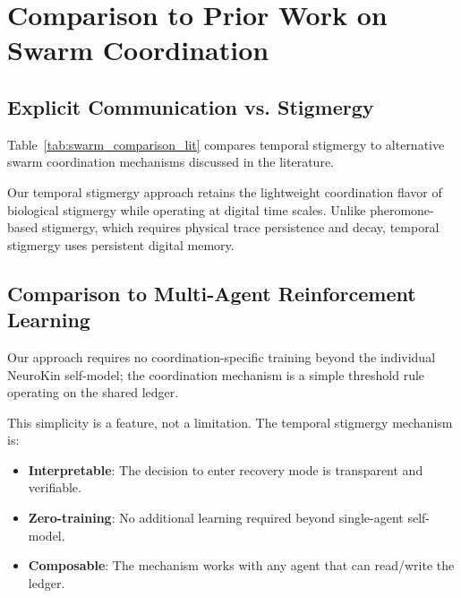 ﻿\documentclass[12pt,a4paper,oneside]{report}
\begin{document}
\section{Comparison to Prior Work on Swarm Coordination}

\subsection{Explicit Communication vs. Stigmergy}

Table~\ref{tab:swarm_comparison_lit} compares temporal stigmergy to alternative swarm coordination mechanisms discussed in the literature.

\begin{table}[H]
\centering
\caption{Comparison of swarm coordination mechanisms.}
\label{tab:swarm_comparison_lit}
\end{table}

Our temporal stigmergy approach retains the lightweight coordination flavor of biological stigmergy while operating at digital time scales. Unlike pheromone-based stigmergy, which requires physical trace persistence and decay, temporal stigmergy uses persistent digital memory.

\subsection{Comparison to Multi-Agent Reinforcement Learning}

Our approach requires no coordination-specific training beyond the individual NeuroKin self-model; the coordination mechanism is a simple threshold rule operating on the shared ledger.

This simplicity is a feature, not a limitation. The temporal stigmergy mechanism is:
\begin{itemize}
    \item \textbf{Interpretable}: The decision to enter recovery mode is transparent and verifiable.
    \item \textbf{Zero-training}: No additional learning required beyond single-agent self-model.
    \item \textbf{Composable}: The mechanism works with any agent that can read/write the ledger.
\end{itemize}
\end{document}
